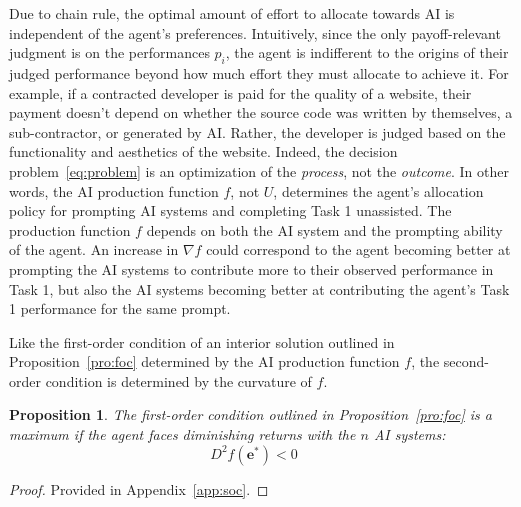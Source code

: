 \documentclass[11pt]{article}
\newtheorem{proposition}{Proposition}
\theoremstyle{definition}
\theoremstyle{remark}
\begin{document}
Due to chain rule, the optimal amount of effort to allocate towards AI is independent of the agent's preferences. Intuitively, since the only payoff-relevant judgment is on the performances $p_i$, the agent is indifferent to the origins of their judged performance beyond how much effort they must allocate to achieve it. For example, if a contracted developer is paid for the quality of a website, their payment doesn't depend on whether the source code was written by themselves, a sub-contractor, or generated by AI. Rather, the developer is judged based on the functionality and aesthetics of the website. Indeed, the decision problem~\ref{eq:problem} is an optimization of the \textit{process}, not the \textit{outcome}. In other words, the AI production function $f$, not $U$, determines the agent's allocation policy for prompting AI systems and completing Task 1 unassisted. The production function $f$ depends on both the AI system and the prompting ability of the agent. An increase in $\nabla f$ could correspond to the agent becoming better at prompting the AI systems to contribute more to their observed performance in Task 1, but also the AI systems becoming better at contributing the agent's Task 1 performance for the same prompt.

Like the first-order condition of an interior solution outlined in Proposition~\ref{pro:foc} determined by the AI production function $f$, the second-order condition is determined by the curvature of $f$. 

\begin{proposition}
\label{pro:soc}
The first-order condition outlined in Proposition~\ref{pro:foc} is a maximum if the agent faces diminishing returns with the $n$ AI systems:
$$D^2f(\mathbf{e}^*)<0\quad$$
\end{proposition}
\begin{proof}
Provided in Appendix~\ref{app:soc}.
\end{proof}
\end{document}
